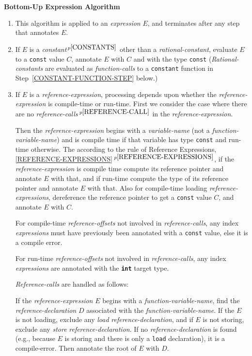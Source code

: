 \documentclass[12pt]{article}
\newcommand{\TT}[1]{{\tt \bfseries #1}}
\newcommand{\itemref}[1]{\ref{#1}$\,^{p\pageref{#1}}$}
\newcommand{\pagnote}[1]{$\,^{p\pageref{#1}}$}
\begin{document}
\bigskip

\centerline{\bf Bottom-Up Expression Algorithm}
\begin{enumerate}

\item This algorithm is applied to an {\em expression} $E$, and
terminates after any step that annotates $E$.

\item\label{CONSTANT-STEP}
If $E$ is a {\em constant}\pagnote{CONSTANTS} other than
a {\em rational-constant}, evaluate $E$
to a {\tt const} value $C$, annotate $E$
with $C$ and with the type {\tt const}
({\em Rational-constants} are evaluated as {\em function-calls} to
a {\tt constant} function in Step~\ref{CONSTANT-FUNCTION-STEP} below.)

\item\label{REFERENCE-EXPRESSION-STEP}
If $E$ is a {\em reference-expression}, processing depends upon whether
the {\em reference-expres\-sion} is compile-time or run-time.
First we consider the case where there are no
{\em reference-calls}\pagnote{REFERENCE-CALL} in the
{\em reference-expression}.

Then the {\em reference-expression} begins with a {\em variable-name}
(not a {\em function-variable-name}) and is compile time if that
variable has type {\tt const} and run-time otherwise.
The according to the rule of
Reference Expressions, \itemref{REFERENCE-EXPRESSIONS},
if the {\em reference-expression} is compile time compute its reference pointer
and annotate $E$ with that, and if run-time compute the type of its
reference pointer and annotate $E$ with that.  Also for compile-time
loading {\em reference-expressions}, dereference the reference pointer
to get a {\tt const} value $C$, and annotate $E$ with $C$.

For compile-time {\em reference-offsets} not involved in {\em reference-calls},
any index {\em expressions} must have previously been annotated with
a {\tt const} value, else it is a compile error.

For run-time {\em reference-offsets} not involved in {\em reference-calls},
any index {\em expressions} are annotated with the \TT{int} target type.

{\em Reference-calls} are handled as follows:

If the {\em reference-expression} $E$ begins with a
{\em function-variable-name}\label{FUNCTION-VARIABLE-NAME-STEP},
find the {\em reference-declaration} $D$ associated with
the {\em function-variable-name}.  If the $E$ is not loading, exclude
any {\em load} {\em reference-declaration}, and if $E$ is not storing,
exclude any {\em store} {\em reference-declaration}.  If no
{\em reference-declaration} is found (e.g., because $E$ is storing
and there is only a {\tt load} declaration), it is a compile-error.
Then annotate the root of $E$ with $D$.


\end{enumerate}
\end{document}
